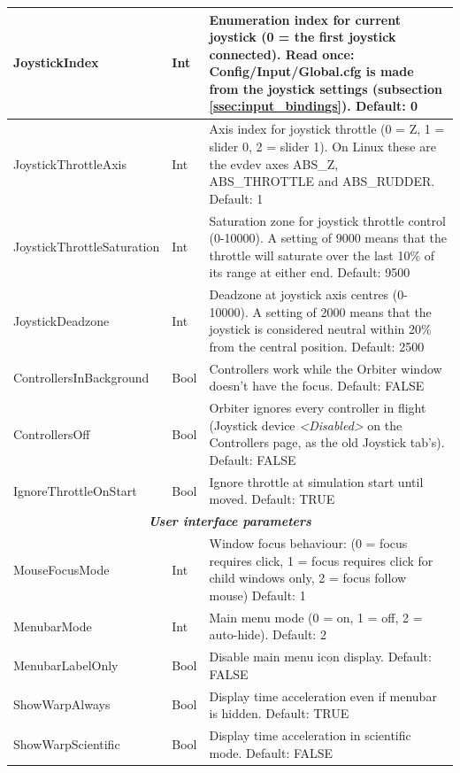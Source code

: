 \documentclass[Orbiter User Manual.tex]{subfiles}
\begin{document}
\begin{longtable}{ |p{}|p{}|p{}| }
	\hline\rule{0pt}{2ex}
	JoystickIndex & Int & Enumeration index for current joystick (0 = the first joystick connected). Read once: Config/Input/Global.cfg is made from the joystick settings (subsection \ref{ssec:input_bindings}). Default: 0\\
	\hline\rule{0pt}{2ex}
	JoystickThrottleAxis & Int & Axis index for joystick throttle (0 = Z, 1 = slider 0, 2 = slider 1). On Linux these are the evdev axes ABS\_Z, ABS\_THROTTLE and ABS\_RUDDER. Default: 1\\
	\hline\rule{0pt}{2ex}
	JoystickThrottleSaturation & Int & Saturation zone for joystick throttle control (0-10000). A setting of 9000 means that the throttle will saturate over the last 10\% of its range at either end. Default: 9500\\
	\hline\rule{0pt}{2ex}
	JoystickDeadzone & Int & Deadzone at joystick axis centres (0-10000). A setting of 2000 means that the joystick is considered neutral within 20\% from the central position. Default: 2500\\
	\hline\rule{0pt}{2ex}
	ControllersInBackground & Bool & Controllers work while the Orbiter window doesn't have the focus. Default: FALSE\\
	\hline\rule{0pt}{2ex}
	ControllersOff & Bool & Orbiter ignores every controller in flight (Joystick device \textit{\textless{}Disabled\textgreater{}} on the Controllers page, as the old Joystick tab's). Default: FALSE\\
	\hline\rule{0pt}{2ex}
	IgnoreThrottleOnStart & Bool & Ignore throttle at simulation start until moved. Default: TRUE\\
	\hline
	\multicolumn{3}{|c|}{\rule{0pt}{2ex}\textbf{\textit{User interface parameters}}}\\
	\hline\rule{0pt}{2ex}
	MouseFocusMode & Int & Window focus behaviour: (0 = focus requires click, 1 = focus requires click for child windows only, 2 = focus follow mouse) Default: 1\\
	\hline\rule{0pt}{2ex}
	MenubarMode & Int & Main menu mode (0 = on, 1 = off, 2 = auto-hide). Default: 2\\
	\hline\rule{0pt}{2ex}
	MenubarLabelOnly & Bool & Disable main menu icon display. Default: FALSE\\
	\hline\rule{0pt}{2ex}
	ShowWarpAlways & Bool & Display time acceleration even if menubar is hidden. Default: TRUE\\
	\hline\rule{0pt}{2ex}
	ShowWarpScientific & Bool & Display time acceleration in scientific mode. Default: FALSE\\

\end{longtable}
\end{document}
